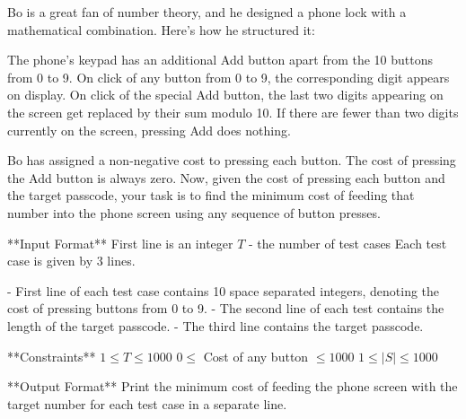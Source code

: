 Bo is a great fan of number theory, and he designed a phone lock with a mathematical combination. Here's how he structured it:

The phone's keypad has an additional Add button apart from the 10 buttons from 0 to 9. On click of any button from 0 to 9, the corresponding digit appears on display. On click of the special Add button, the last two digits appearing on the screen get replaced by their sum modulo 10. If there are fewer than two digits currently on the screen, pressing Add does nothing.

Bo has assigned a non-negative cost to pressing each button. The cost of pressing the Add button is always zero. Now, given the cost of pressing each button and the target passcode, your task is to find the minimum cost of feeding that number into the phone screen using any sequence of button presses.

**Input Format**  
First line is an integer $T$ - the number of test cases  
Each test case is given by 3 lines.  

- First line of each test case contains 10 space separated integers, denoting the cost of pressing buttons from 0 to 9.  
- The second line of each test contains the length of the target passcode.  
- The third line contains the target passcode.  

**Constraints**  
$1 \leq T \leq 1000$  
$0 \leq$ Cost of any button $\leq 1000$  
$1 \leq |S| \leq 1000$

**Output Format**  
Print the minimum cost of feeding the phone screen with the target number for each test case in a separate line.